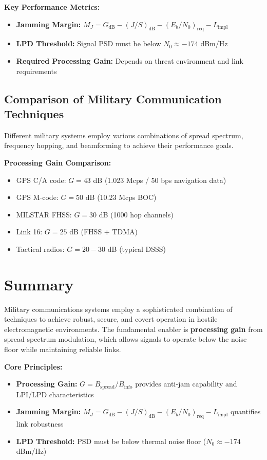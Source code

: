 \textbf{Key Performance Metrics:}

\begin{itemize}
\item \textbf{Jamming Margin:} $M_J = G_{\text{dB}} - (J/S)_{\text{dB}} - (E_b/N_0)_{\text{req}} - L_{\text{impl}}$
\item \textbf{LPD Threshold:} Signal PSD must be below $N_0 \approx -174$ dBm/Hz
\item \textbf{Required Processing Gain:} Depends on threat environment and link requirements
\end{itemize}

\subsection{Comparison of Military Communication Techniques}

Different military systems employ various combinations of spread spectrum, frequency hopping, and beamforming to achieve their performance goals.

\textbf{Processing Gain Comparison:}
\begin{itemize}
\item GPS C/A code: $G = 43$ dB (1.023 Mcps / 50 bps navigation data)
\item GPS M-code: $G = 50$ dB (10.23 Mcps BOC)
\item MILSTAR FHSS: $G = 30$ dB (1000 hop channels)
\item Link 16: $G = 25$ dB (FHSS + TDMA)
\item Tactical radios: $G = 20-30$ dB (typical DSSS)
\end{itemize}

\section{Summary}

Military communications systems employ a sophisticated combination of techniques to achieve robust, secure, and covert operation in hostile electromagnetic environments. The fundamental enabler is \textbf{processing gain} from spread spectrum modulation, which allows signals to operate below the noise floor while maintaining reliable links.

\textbf{Core Principles:}
\begin{itemize}
\item \textbf{Processing Gain:} $G = B_{\text{spread}}/B_{\text{info}}$ provides anti-jam capability and LPI/LPD characteristics
\item \textbf{Jamming Margin:} $M_J = G_{\text{dB}} - (J/S)_{\text{dB}} - (E_b/N_0)_{\text{req}} - L_{\text{impl}}$ quantifies link robustness
\item \textbf{LPD Threshold:} PSD must be below thermal noise floor ($N_0 \approx -174$ dBm/Hz)
\end{itemize}

